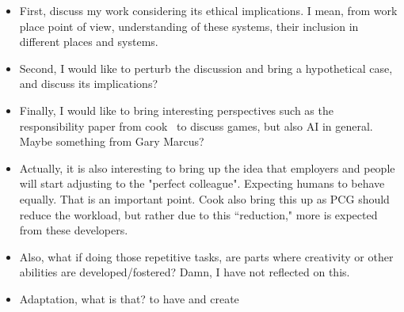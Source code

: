 \begin{itemize}
    \item First, discuss my work considering its ethical implications. I mean, from work place point of view, understanding of these systems, their inclusion in different places and systems.
    \item Second, I would like to perturb the discussion and bring a hypothetical case, and discuss its implications? 
    \item Finally, I would like to bring interesting perspectives such as the responsibility paper from cook~\cite{cook_social_2021} to discuss games, but also AI in general. Maybe something from Gary Marcus? 
    \item Actually, it is also interesting to bring up the idea that employers and people will start adjusting to the "perfect colleague". Expecting humans to behave equally. That is an important point. Cook also bring this up as PCG should reduce the workload, but rather due to this ``reduction," more is expected from these developers.
    \item Also, what if doing those repetitive tasks, are parts where creativity or other abilities are developed/fostered? Damn, I  have not reflected on this.
    \item Adaptation, what is that?
    to have and create 
\end{itemize}









